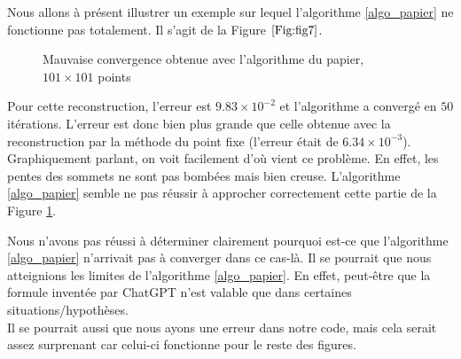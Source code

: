 Nous allons à présent illustrer un exemple sur lequel l'algorithme \eqref{algo_papier} ne fonctionne pas totalement. Il s'agit de la Figure $\ref{Fig:fig7}$. 
\begin{figure}[!ht]
\centering
    \begin{minipage}[t]{0.48\textwidth}
        \centering
        \caption{Mauvaise convergence obtenue avec l'algorithme du papier, \\[1ex] \centering  $101\times101$ points}
        \label{Fig:fig7_opti}
    \end{minipage}
\end{figure}
\newpage
Pour cette reconstruction, l'erreur est $9.83 \times 10^{-2}$ et l'algorithme a convergé en $50$ itérations. L'erreur est donc bien plus grande que celle obtenue avec la reconstruction par la méthode du point fixe (l'erreur était de $6.34 \times 10^{-3}$). Graphiquement parlant, on voit facilement d'où vient ce problème. En effet, les pentes des sommets ne sont pas bombées mais bien creuse. L'algorithme \eqref{algo_papier} semble ne pas réussir à approcher correctement cette partie de la Figure \ref{Fig:fig7_opti}.

\begin{noremark}
    Nous n'avons pas réussi à déterminer clairement pourquoi est-ce que l'algorithme \eqref{algo_papier} n'arrivait pas à converger dans ce cas-là. Il se pourrait que nous atteignions les limites de l'algorithme \eqref{algo_papier}. En effet, peut-être que la formule \og inventée \fg{} par ChatGPT n'est valable que dans certaines situations/hypothèses. \\ 
    Il se pourrait aussi que nous ayons une erreur dans notre code, mais cela serait assez surprenant car celui-ci fonctionne pour le reste des figures.
\end{noremark}




